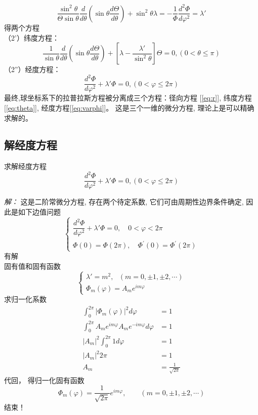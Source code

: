 	\begin{equation*}
		\frac{\sin ^{2} \theta}{\Theta \sin \theta} \frac{d}{d \theta}\left(\sin \theta \frac{d \Theta}{d \theta}\right)+\sin ^{2} \theta \lambda=-\frac{1}{\Phi} \frac{d^{2} \Phi}{d \varphi^{2}}=\lambda'
	\end{equation*}
	得两个方程 \\
	（2'）纬度方程：
	\begin{equation}\label{eq:theta}
		\frac{1}{\sin \theta} \frac{d}{d \theta}\left(\sin \theta \frac{d \Theta}{d \theta}\right)+\left[\lambda-\frac{\lambda'}{\sin ^{2} \theta}\right] \Theta=0,(0<\theta \le \pi)
	\end{equation}		
	（2''）经度方程：
	\begin{equation}\label{eq:varphi}
		\frac{d^{2} \Phi}{d \varphi^{2}}+\lambda' \Phi=0,(0<\varphi\le2 \pi)
	\end{equation}	
	最终,球坐标系下的拉普拉斯方程被分离成三个方程：径向方程 [\ref{eq:r}], 纬度方程[\ref{eq:theta}], 经度方程[\ref{eq:varphi}]。 这是三个一维的微分方程, 理论上是可以精确求解的。

	\subsection{解经度方程}
	\begin{example}
	求解经度方程
	\begin{equation*}
		\frac{d^{2} \Phi}{d \varphi^{2}}+\lambda' \Phi=0,(0<\varphi\le2 \pi)
	\end{equation*}
	\end{example}
	\emph{解：}
	这是二阶常微分方程, 存在两个待定系数, 它们可由周期性边界条件确定, 因此是如下边值问题
		\[\begin{cases}
			\dfrac{d^{2} \Phi}{d \varphi^{2}}+\lambda' \Phi=0,\quad 0 < \varphi < 2 \pi \\ 
			\Phi(0)=\Phi(2 \pi), \quad \Phi^{\prime}(0)=\Phi^{\prime}(2 \pi)
		\end{cases}\]
		有解\\	
		固有值和固有函数
		\[\begin{cases}
			\lambda'=m^2, ~~~ (m=0,\pm 1,\pm 2,\cdots) \\ 
			\Phi_m (\varphi)=A_m e^{im\varphi}
		\end{cases}\]	
		求归一化系数 
		\begin{equation*}
		\begin{split}
			\int_{0}^{2\pi}  |\Phi_m (\varphi)|^2 d\varphi &= 1 \\
			\int_{0}^{2\pi}  A_m e^{im\varphi} A_m e^{-im\varphi} d\varphi &= 1 \\
			|A_m|^2 \int_{0}^{2\pi} 1 d\varphi &= 1 \\
			|A_m|^2 2\pi &= 1 \\
			A_m&=\frac{1}{\sqrt{2\pi}} 
		\end{split}
		\end{equation*}
		代回， 得归一化固有函数	
		\begin{equation}
		\boxed{\Phi_m (\varphi)=\frac{1}{\sqrt{2\pi}} e^{im\varphi}, \qquad (m=0,\pm 1,\pm 2,\cdots)}  
		\end{equation}	
	结束！ 
	
